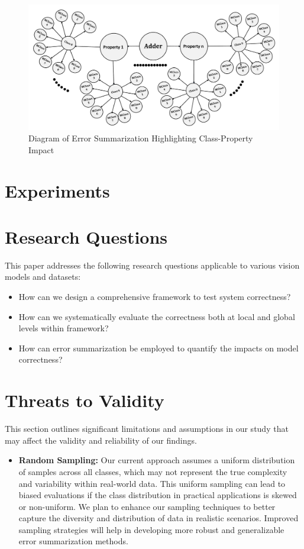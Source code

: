 \documentclass[10pt, conference, a4paper, final]{IEEEtran}
\begin{document}
\begin{figure}[H]
    \centering
    \includegraphics[width=\linewidth]{paper_images/step5.pdf}
    \caption{Diagram of Error Summarization Highlighting Class-Property Impact}
    \label{fig:error-summarization}
\end{figure}

\section{Experiments}

\section{Research Questions}

This paper addresses the following research questions applicable to various vision models and datasets:

\begin{itemize}
    \item How can we design a comprehensive framework to test system correctness?
    \item How can we systematically evaluate the correctness both at local and global levels within framework?
    \item How can error summarization be employed to quantify the impacts on model correctness?
 
\end{itemize}
\section{Threats to Validity}

This section outlines significant limitations and assumptions in our study that may affect the validity and reliability of our findings.

\begin{itemize}
    \item \textbf{Random Sampling:} Our current approach assumes a uniform distribution of samples across all classes, which may not represent the true complexity and variability within real-world data. This uniform sampling can lead to biased evaluations if the class distribution in practical applications is skewed or non-uniform. We plan to enhance our sampling techniques to better capture the diversity and distribution of data in realistic scenarios. Improved sampling strategies will help in developing more robust and generalizable error summarization methods.
\end{itemize}
\end{document}
